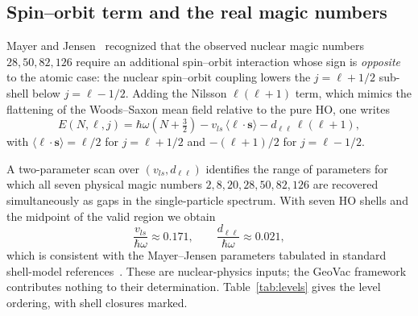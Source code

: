 \documentclass[twocolumn,prc,amsmath,amssymb,superscriptaddress]{revtex4-2}
\begin{document}
\subsection{Spin--orbit term and the real magic numbers}

Mayer and Jensen~\cite{Mayer1949,Jensen1949} recognized that the
observed nuclear magic numbers $28, 50, 82, 126$ require an additional
spin--orbit interaction whose sign is \emph{opposite} to the atomic
case: the nuclear spin--orbit coupling lowers the $j = \ell + 1/2$
sub-shell below $j = \ell - 1/2$. Adding the Nilsson $\ell(\ell+1)$
term, which mimics the flattening of the Woods--Saxon mean field
relative to the pure HO, one writes
\begin{equation}
  E(N,\ell,j) = \hbar\omega\left(N + \tfrac{3}{2}\right)
  - v_{ls}\,\langle\boldsymbol{\ell}\cdot\mathbf{s}\rangle
  - d_{\ell\ell}\,\ell(\ell+1),
\label{eq:mayer-jensen}
\end{equation}
with $\langle \boldsymbol{\ell}\cdot\mathbf{s}\rangle = \ell/2$ for
$j = \ell + 1/2$ and $-(\ell+1)/2$ for $j = \ell - 1/2$.

A two-parameter scan over $(v_{ls}, d_{\ell\ell})$ identifies the range
of parameters for which all seven physical magic numbers $2, 8, 20, 28,
50, 82, 126$ are recovered simultaneously as gaps in the single-particle
spectrum. With seven HO shells and the midpoint of the valid region we
obtain
\begin{equation}
  \frac{v_{ls}}{\hbar\omega} \approx 0.171, \qquad
  \frac{d_{\ell\ell}}{\hbar\omega} \approx 0.021 ,
\label{eq:optimal}
\end{equation}
which is consistent with the Mayer--Jensen parameters tabulated in
standard shell-model references~\cite{Suhonen2007,Talmi1993}. These
are nuclear-physics inputs; the GeoVac framework contributes nothing
to their determination. Table~\ref{tab:levels} gives the level
ordering, with shell closures marked.
\end{document}
